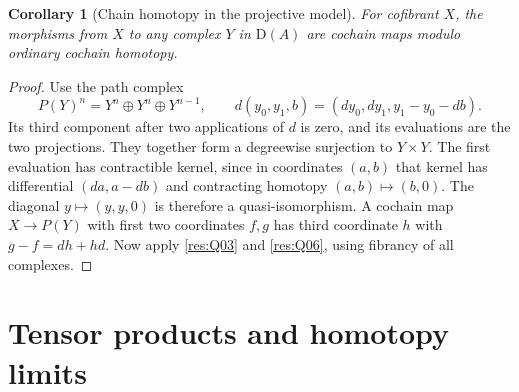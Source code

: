\documentclass[11pt,oneside,openany]{book}
\newtheorem{corollary}[theorem]{Corollary}
\theoremstyle{definition}
\theoremstyle{remark}
\begin{document}
\begin{corollary}[Chain homotopy in the projective model]\label{res:Q14}
For cofibrant \(X\), the morphisms from \(X\) to any
complex \(Y\) in \(\mathrm D(A)\) are cochain maps modulo
ordinary cochain homotopy.
\end{corollary}
\begin{proof}
Use the path complex
\[
 P(Y)^n=Y^n\oplus Y^n\oplus Y^{n-1},\qquad
 d(y_0,y_1,b)=(dy_0,dy_1,y_1-y_0-db).
\]
Its third component after two applications of \(d\) is
zero, and its evaluations are the two projections. They
together form a degreewise surjection to \(Y\times Y\).
The first evaluation has contractible kernel, since in
coordinates \((a,b)\) that kernel has differential
\((da,a-db)\) and contracting homotopy \((a,b)\mapsto(b,0)\).
The diagonal \(y\mapsto(y,y,0)\) is therefore a
quasi-isomorphism. A cochain map \(X\to P(Y)\) with
first two coordinates \(f,g\) has third coordinate
\(h\) with \(g-f=d h+h d\). Now apply \ref{res:Q03}
and \ref{res:Q06}, using fibrancy of all complexes.
\end{proof}

\section{Tensor products and homotopy limits}
\end{document}
